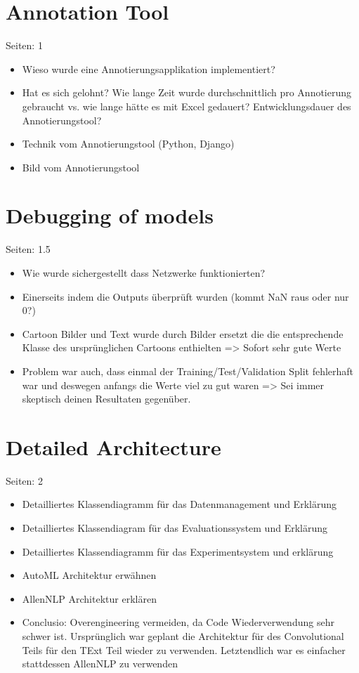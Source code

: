 \documentclass[draft,final,oneside]{vutinfth} %
\begin{document}
\section{Annotation Tool}

Seiten: 1

\begin{itemize}
\item Wieso wurde eine Annotierungsapplikation implementiert?
\item Hat es sich gelohnt? Wie lange Zeit wurde durchschnittlich pro Annotierung gebraucht vs. wie lange hätte es mit Excel gedauert? Entwicklungsdauer des Annotierungstool?
\item Technik vom Annotierungstool (Python, Django)
\item Bild vom Annotierungstool
\end{itemize}


\section{Debugging of models}

Seiten: 1.5

\begin{itemize}
\item Wie wurde sichergestellt dass Netzwerke funktionierten? 
\item Einerseits indem die Outputs überprüft wurden (kommt NaN raus oder nur 0?)
\item Cartoon Bilder und Text wurde durch Bilder ersetzt die die entsprechende Klasse des ursprünglichen Cartoons enthielten => Sofort sehr gute Werte
\item Problem war auch, dass einmal der Training/Test/Validation Split fehlerhaft war und deswegen anfangs die Werte viel zu gut waren => Sei immer skeptisch deinen Resultaten gegenüber.
\end{itemize}


\section{Detailed Architecture}

Seiten: 2

\begin{itemize}

\item Detailliertes Klassendiagramm für das Datenmanagement und Erklärung
\item Detailliertes Klassendiagram für das Evaluationssystem und Erklärung
\item Detailliertes Klassendiagramm für das Experimentsystem und erklärung 
\item AutoML Architektur erwähnen
\item AllenNLP Architektur erklären
\item Conclusio: Overengineering vermeiden, da Code Wiederverwendung sehr schwer ist. Ursprünglich war geplant die Architektur für des Convolutional Teils für den TExt Teil wieder zu verwenden. Letztendlich war es einfacher stattdessen AllenNLP zu verwenden

\end{itemize}
\end{document}

